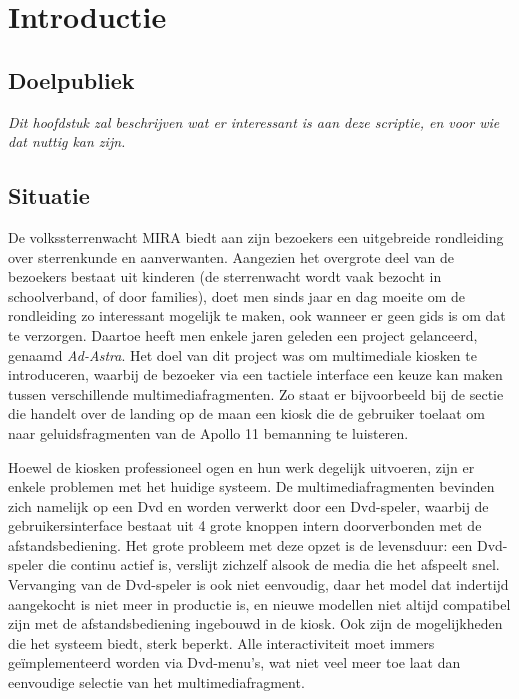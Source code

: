 \part{Introductie}
\label{introductie}


%
%

\chapter{Doelpubliek}
\label{introductie:doelpubliek}

\textit{Dit hoofdstuk zal beschrijven wat er interessant is aan deze scriptie, en voor wie dat nuttig kan zijn.}


%
%

\chapter{Situatie}
\label{introductie:situatie}

De volkssterrenwacht MIRA biedt aan zijn bezoekers een uitgebreide rondleiding over sterrenkunde en aanverwanten. Aangezien het overgrote deel van de bezoekers bestaat uit kinderen (de sterrenwacht wordt vaak bezocht in schoolverband, of door families), doet men sinds jaar en dag moeite om de rondleiding zo interessant mogelijk te maken, ook wanneer er geen gids is om dat te verzorgen. Daartoe heeft men enkele jaren geleden een project gelanceerd, genaamd \emph{Ad-Astra}. Het doel van dit project was om multimediale kiosken te introduceren, waarbij de bezoeker via een tactiele interface een keuze kan maken tussen verschillende multimediafragmenten. Zo staat er bijvoorbeeld bij de sectie die handelt over de landing op de maan een kiosk die de gebruiker toelaat om naar geluidsfragmenten van de Apollo 11 bemanning te luisteren.

Hoewel de kiosken professioneel ogen en hun werk degelijk uitvoeren, zijn er enkele problemen met het huidige systeem. De multimediafragmenten bevinden zich namelijk op een Dvd en worden verwerkt door een Dvd-speler, waarbij de gebruikersinterface bestaat uit 4 grote knoppen intern doorverbonden met de afstandsbediening.
Het grote probleem met deze opzet is de levensduur: een Dvd-speler die continu actief is, verslijt zichzelf alsook de media die het afspeelt snel. Vervanging van de Dvd-speler is ook niet eenvoudig, daar het model dat indertijd aangekocht is niet meer in productie is, en nieuwe modellen niet altijd compatibel zijn met de afstandsbediening ingebouwd in de kiosk.
Ook zijn de mogelijkheden die het systeem biedt, sterk beperkt. Alle interactiviteit moet immers geïmplementeerd worden via Dvd-menu's, wat niet veel meer toe laat dan eenvoudige selectie van het multimediafragment.

